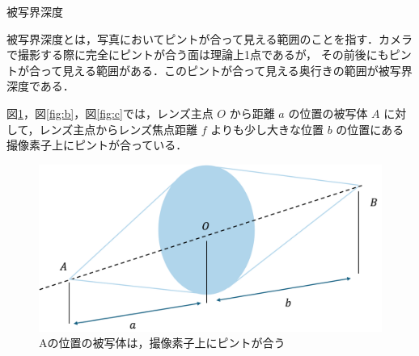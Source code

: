 \documentclass[8pt, jfont=ipaexm, t]{beamer} %
\begin{document}
\begin{frame}[allowframebreaks]{被写界深度}
  \begin{block}{}
    被写界深度とは，写真においてピントが合って見える範囲のことを指す．カメラで撮影する際に完全にピントが合う面は理論上1点であるが，
    その前後にもピントが合って見える範囲がある．このピントが合って見える奥行きの範囲が被写界深度である．
  \end{block}

  図\ref{fig:a}，図\ref{fig:b}，図\ref{fig:c}では，レンズ主点 $O$ から距離 $a$ の位置の被写体 $A$ に対して，レンズ主点からレンズ焦点距離 $f$ よりも少し大きな位置 $b$ の位置にある
  撮像素子上にピントが合っている．


  \begin{figure}[H]
    \centering
    \includegraphics[scale=0.4]{figure/06.png}
    \caption{Aの位置の被写体は，撮像素子上にピントが合う}
    \label{fig:a}
  \end{figure}


\end{frame}
\end{document}
